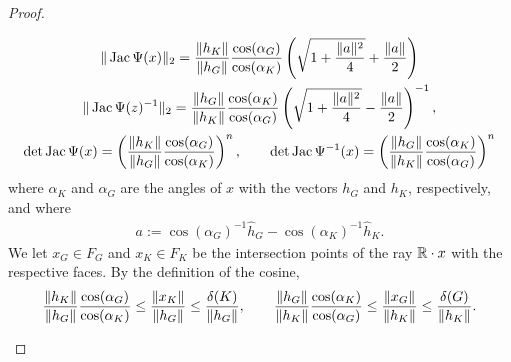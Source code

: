 \documentclass[10pt,letterpaper]{article}
\begin{document}
\begin{proof}
\begin{itemize}
        \begin{gather*}
            \|  \operatorname{{\rm Jac}}\Psi(x)  \|_{2}
            = 
            \frac{ \| h_K \| }{ \| h_{{G}} \| }
            \frac{ \cos(\alpha_{{G}}) }{ \cos(\alpha_K) }
            \left( 
                \sqrt{ 1 + \frac{ \|a\|^{2} }{ 4 } } + \frac{ \|a\| }{2}
            \right)
            \\
            \|  \operatorname{{\rm Jac}}\Psi(z)^{-1}  \|_{2}
            = 
            \frac{ \| h_{{G}} \| }{ \| h_K \| }
            \frac{ \cos(\alpha_K) }{ \cos(\alpha_{{G}}) }
            \left( 
                \sqrt{ 1 + \frac{ \|a\|^{2} }{ 4 } } - \frac{ \|a\| }{2}
            \right)^{-1},
            \\
            \det\operatorname{{\rm Jac}}\Psi(x)
            =
            \left( 
            \frac{ \| h_K \| }{ \| h_{{G}} \| }
            \frac{ \cos(\alpha_{{G}}) }{ \cos(\alpha_K) }
            \right)^{n},
            \qquad
            \det\operatorname{{\rm Jac}}\Psi^{-1}(x)
            =
            \left( 
            \frac{ \| h_{{G}} \| }{ \| h_{K} \| }
            \frac{ \cos(\alpha_{K}) }{ \cos(\alpha_{{G}}) }
            \right)^{n}
        \end{gather*}
        where $\alpha_K$ and $\alpha_{{G}}$ are the angles of $x$ with the vectors $h_{{G}}$ and $h_{K}$, respectively,
        and where 
        \begin{align*}
            a := \cos(\alpha_{{G}})^{-1} \hat h_{{G}} - \cos(\alpha_K)^{-1} \hat h_K
            .
        \end{align*}
        We let $x_{G} \in F_{G}$ and $x_{K} \in F_{K}$ be the intersection points of the ray ${\mathbb R} \cdot x$ with the respective faces.
        By the definition of the cosine, 
        \begin{align*}
            \frac{ \| h_K \| }{ \| h_{{G}} \| }
            \frac{ \cos(\alpha_{{G}}) }{ \cos(\alpha_K) }
            \leq 
            \frac{ \| x_K \| }{ \| h_{{G}} \| }
            \leq 
            \frac{ {\delta}(K) }{ \| h_{{G}} \| }
            ,
            \qquad 
            \frac{ \| h_{{G}} \| }{ \| h_K \| }
            \frac{ \cos(\alpha_K) }{ \cos(\alpha_{{G}}) }
            \leq 
            \frac{ \| x_{G} \| }{ \| h_{K} \| }
            \leq 
            \frac{ {\delta}(G) }{ \| h_{K} \| }
            .
        \end{align*}


\end{itemize}
\end{proof}
\end{document}
